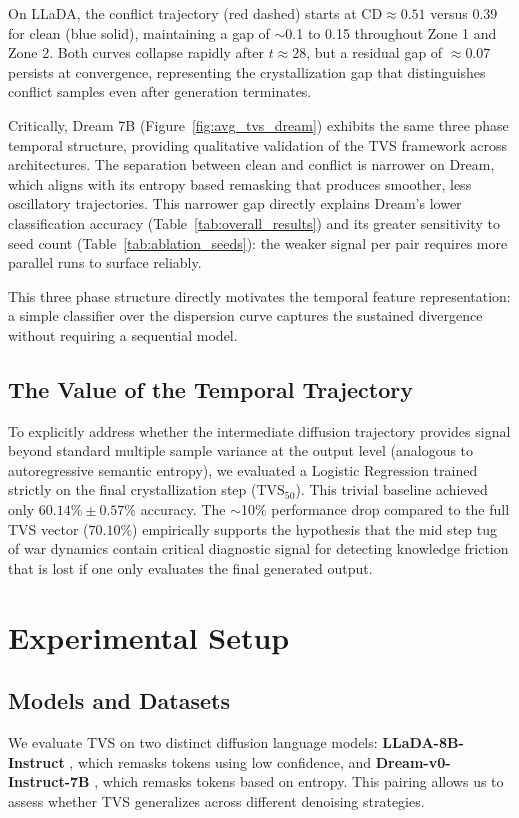 \documentclass[11pt]{article}
\begin{document}
On LLaDA, the conflict trajectory (red dashed) starts at $\text{CD} \approx 0.51$ versus $0.39$ for clean (blue solid), maintaining a gap of $\sim$0.1 to 0.15 throughout Zone 1 and Zone 2. Both curves collapse rapidly after $t \approx 28$, but a residual gap of $\approx 0.07$ persists at convergence, representing the crystallization gap that distinguishes conflict samples even after generation terminates.

Critically, Dream 7B (Figure~\ref{fig:avg_tvs_dream}) exhibits the same three phase temporal structure, providing qualitative validation of the TVS framework across architectures. The separation between clean and conflict is narrower on Dream, which aligns with its entropy based remasking that produces smoother, less oscillatory trajectories. This narrower gap directly explains Dream's lower classification accuracy (Table~\ref{tab:overall_results}) and its greater sensitivity to seed count (Table~\ref{tab:ablation_seeds}): the weaker signal per pair requires more parallel runs to surface reliably.

This three phase structure directly motivates the temporal feature representation: a simple classifier over the dispersion curve captures the sustained divergence without requiring a sequential model.

\subsection{The Value of the Temporal Trajectory}
To explicitly address whether the intermediate diffusion trajectory provides signal beyond standard multiple sample variance at the output level (analogous to autoregressive semantic entropy), we evaluated a Logistic Regression trained strictly on the final crystallization step ($\text{TVS}_{50}$). This trivial baseline achieved only $60.14\% \pm 0.57\%$ accuracy. The $\sim$10\% performance drop compared to the full TVS vector ($70.10\%$) empirically supports the hypothesis that the mid step tug of war dynamics contain critical diagnostic signal for detecting knowledge friction that is lost if one only evaluates the final generated output.

\section{Experimental Setup}
\label{sec:setup}

\subsection{Models and Datasets}
We evaluate TVS on two distinct diffusion language models: \textbf{LLaDA-8B-Instruct} \citep{nie2024llada}, which remasks tokens using low confidence, and \textbf{Dream-v0-Instruct-7B} \citep{zheng2024dream}, which remasks tokens based on entropy. This pairing allows us to assess whether TVS generalizes across different denoising strategies.
\end{document}
